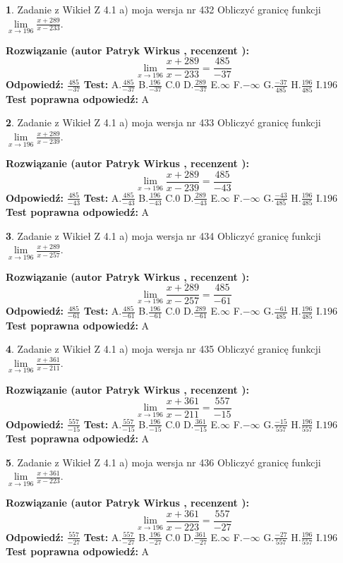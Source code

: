 \documentclass[12pt, a4paper]{article}
\theoremstyle{definition} %
\newtheorem{zad}{}
\newcommand{\zadStart}[1]{\begin{zad}#1\newline}
\newcommand{\zadStop}{\end{zad}}
\newcommand{\rozwStart}[2]{\noindent \textbf{Rozwiązanie (autor #1 , recenzent #2): }\newline}
\newcommand{\rozwStop}{\newline}
\newcommand{\odpStart}{\noindent \textbf{Odpowiedź:}\newline}
\newcommand{\odpStop}{\newline}
\newcommand{\testStart}{\noindent \textbf{Test:}\newline}
\newcommand{\testStop}{\newline}
\newcommand{\kluczStart}{\noindent \textbf{Test poprawna odpowiedź:}\newline}
\newcommand{\kluczStop}{\newline}
\begin{document}
\zadStart{Zadanie z Wikieł Z 4.1 a) moja wersja nr 432}
Obliczyć granicę funkcji $\lim\limits_{x\to196}\frac{x+289}{x-233}$.
\zadStop
\rozwStart{Patryk Wirkus}{}
$$\lim\limits_{x\to196}\frac{x+289}{x-233} = \frac{485}{-37}$$
\rozwStop
\odpStart
$\frac{485}{-37}$
\odpStop
\testStart
A.$\frac{485}{-37}$
B.$\frac{196}{-37}$
C.$0$
D.$\frac{289}{-37}$
E.$\infty$
F.$-\infty$
G.$\frac{-37}{485}$
H.$\frac{196}{485}$
I.$196$
\testStop
\kluczStart
A
\kluczStop



\zadStart{Zadanie z Wikieł Z 4.1 a) moja wersja nr 433}
Obliczyć granicę funkcji $\lim\limits_{x\to196}\frac{x+289}{x-239}$.
\zadStop
\rozwStart{Patryk Wirkus}{}
$$\lim\limits_{x\to196}\frac{x+289}{x-239} = \frac{485}{-43}$$
\rozwStop
\odpStart
$\frac{485}{-43}$
\odpStop
\testStart
A.$\frac{485}{-43}$
B.$\frac{196}{-43}$
C.$0$
D.$\frac{289}{-43}$
E.$\infty$
F.$-\infty$
G.$\frac{-43}{485}$
H.$\frac{196}{485}$
I.$196$
\testStop
\kluczStart
A
\kluczStop



\zadStart{Zadanie z Wikieł Z 4.1 a) moja wersja nr 434}
Obliczyć granicę funkcji $\lim\limits_{x\to196}\frac{x+289}{x-257}$.
\zadStop
\rozwStart{Patryk Wirkus}{}
$$\lim\limits_{x\to196}\frac{x+289}{x-257} = \frac{485}{-61}$$
\rozwStop
\odpStart
$\frac{485}{-61}$
\odpStop
\testStart
A.$\frac{485}{-61}$
B.$\frac{196}{-61}$
C.$0$
D.$\frac{289}{-61}$
E.$\infty$
F.$-\infty$
G.$\frac{-61}{485}$
H.$\frac{196}{485}$
I.$196$
\testStop
\kluczStart
A
\kluczStop



\zadStart{Zadanie z Wikieł Z 4.1 a) moja wersja nr 435}
Obliczyć granicę funkcji $\lim\limits_{x\to196}\frac{x+361}{x-211}$.
\zadStop
\rozwStart{Patryk Wirkus}{}
$$\lim\limits_{x\to196}\frac{x+361}{x-211} = \frac{557}{-15}$$
\rozwStop
\odpStart
$\frac{557}{-15}$
\odpStop
\testStart
A.$\frac{557}{-15}$
B.$\frac{196}{-15}$
C.$0$
D.$\frac{361}{-15}$
E.$\infty$
F.$-\infty$
G.$\frac{-15}{557}$
H.$\frac{196}{557}$
I.$196$
\testStop
\kluczStart
A
\kluczStop



\zadStart{Zadanie z Wikieł Z 4.1 a) moja wersja nr 436}
Obliczyć granicę funkcji $\lim\limits_{x\to196}\frac{x+361}{x-223}$.
\zadStop
\rozwStart{Patryk Wirkus}{}
$$\lim\limits_{x\to196}\frac{x+361}{x-223} = \frac{557}{-27}$$
\rozwStop
\odpStart
$\frac{557}{-27}$
\odpStop
\testStart
A.$\frac{557}{-27}$
B.$\frac{196}{-27}$
C.$0$
D.$\frac{361}{-27}$
E.$\infty$
F.$-\infty$
G.$\frac{-27}{557}$
H.$\frac{196}{557}$
I.$196$
\testStop
\kluczStart
A
\kluczStop
\end{document}
